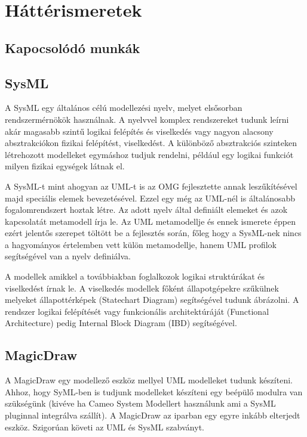 \chapter{Háttérismeretek}

\section{Kapocsolódó munkák}

\section{SysML}

A SysML egy általános célú modellezési nyelv, melyet elsősorban rendszermérnökök használnak. A nyelvvel komplex rendszereket tudunk leírni akár magasabb szintű logikai felépítés és viselkedés vagy nagyon alacsony absztrakciókon fizikai felépítést, viselkedést. A különböző absztrakciós szinteken létrehozott modelleket egymáshoz tudjuk rendelni, például egy logikai funkciót milyen fizikai egységek látnak el.

A SysML-t mint ahogyan az UML-t is az OMG fejlesztette annak leszűkítésével majd speciális elemek bevezetésével. Ezzel egy még az UML-nél is általánosabb fogalomrendszert hoztak létre.
Az adott nyelv által definiált elemeket és azok kapcsolatát metamodell írja le. Az UML metamodellje és ennek ismerete éppen ezért jelentős szerepet töltött be a fejlesztés során, főleg hogy a SysML-nek nincs a hagyományos értelemben vett külön metamodellje, hanem UML profilok segítségével van a nyelv definiálva. 



A modellek amikkel a továbbiakban foglalkozok logikai struktúrákat és viselkedést írnak le. A viselkedés modellek főként állapotgépekre szűkülnek melyeket állapottérképek (Statechart Diagram) segítségével tudunk ábrázolni. A rendszer logikai felépítését vagy funkcionális architektúráját (Functional Architecture) pedig Internal Block Diagram (IBD) segítségével.




\section{MagicDraw}

A MagicDraw egy modellező eszköz mellyel UML modelleket tudunk készíteni. Ahhoz, hogy SyML-ben is tudjunk modelleket készíteni egy beépülő modulra van szükségünk (kivéve ha Cameo System Modellert használunk ami a SysML pluginnal integrálva szállít). A MagicDraw az iparban egy egyre inkább elterjedt eszköz. Szigorúan követi az UML és SysML szabványt.


